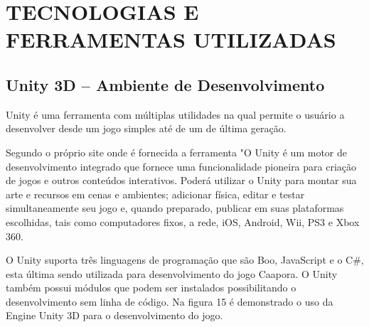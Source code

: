 \chapter{TECNOLOGIAS E FERRAMENTAS UTILIZADAS}
\label{cap:TECNOLOGIAS-E-FERRAMENTAS-UTILIZADAS}


\section{Unity 3D – Ambiente de Desenvolvimento}
\label{sec:Unity-3D---Ambiente-de-Desenvolvimento}

Unity é uma ferramenta com múltiplas utilidades na qual permite o usuário a desenvolver desde um jogo simples até de um de última geração.

Segundo o próprio site onde é fornecida a ferramenta "O Unity é um motor de desenvolvimento integrado que fornece uma funcionalidade pioneira para criação de jogos e outros conteúdos interativos. Poderá utilizar o Unity para montar sua arte e recursos em cenas e ambientes; adicionar física, editar e testar simultaneamente seu jogo e, quando preparado, publicar em suas plataformas escolhidas, tais como computadores fixos, a rede, iOS, Android, Wii, PS3 e Xbox 360. 

O Unity suporta três linguagens de programação que são Boo, JavaScript e o C\#, esta última sendo utilizada para desenvolvimento do jogo Caapora. O Unity também possui módulos que podem ser instalados possibilitando o desenvolvimento sem linha de código. Na figura 15 é demonstrado o uso da Engine Unity 3D para o desenvolvimento do jogo. \cite{unt}



	\begin{figure}[h!]
		\centering
	\end{figure}
	
